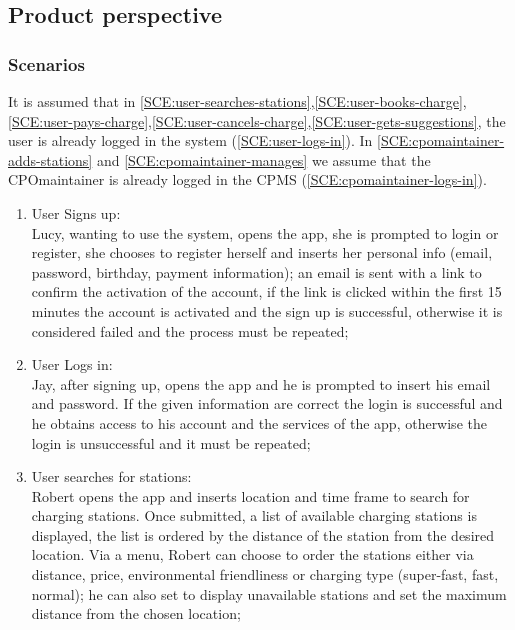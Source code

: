 \subsection{Product perspective}

\subsubsection{Scenarios}
It is assumed that in \ref{SCE:user-searches-stations},\ref{SCE:user-books-charge},\ref{SCE:user-pays-charge},\ref{SCE:user-cancels-charge},\ref{SCE:user-gets-suggestions}, the user is already logged in the system (\ref{SCE:user-logs-in}). In \ref{SCE:cpomaintainer-adds-stations} and \ref{SCE:cpomaintainer-manages} we assume that the \ac{CPO}maintainer is already logged in the \ac{CPMS} (\ref{SCE:cpomaintainer-logs-in}).
\begin{enumerate}[label=\textbf{S\arabic*}]
      \item User Signs up:\\
            Lucy, wanting to use the system, opens the app, she is prompted to login or register,
            she chooses to register herself and inserts her personal info (email, password, birthday, payment information);
            an email is sent with a link to confirm the activation of the account, if the link is clicked within
            the first 15 minutes the account is activated and the sign up is successful,
            otherwise it is considered failed and the process must be repeated;\label{SCE:user-signs-up}
      \item User Logs in:\\
            Jay, after signing up, opens the app and he is prompted to insert his email and password.
            If the given information are correct the login is successful and he obtains access to his account
            and the services of the app, otherwise the login is unsuccessful and it must be repeated;\label{SCE:user-logs-in}
      \item User searches for stations:\\
            Robert opens the app and inserts location and time frame to search for charging stations.
            Once submitted, a list of available charging stations is displayed, the list is ordered by the distance of the station
            from the desired location. Via a menu, Robert can choose to order the stations either via distance, price, environmental friendliness or charging type (super-fast, fast, normal); he can also set to display unavailable stations and set the maximum distance from the chosen location;\label{SCE:user-searches-stations}

\end{enumerate}
